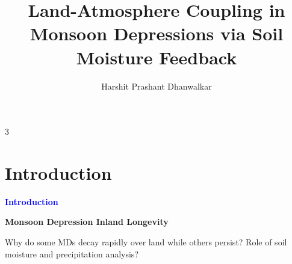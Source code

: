 \documentclass[8pt, aspectratio=169]{beamer}
\title{Land-Atmosphere Coupling in Monsoon Depressions via Soil Moisture Feedback}
\author{Harshit Prashant Dhanwalkar}
\date{}
\newcommand{\pdflink}[2]{\href{file:papers/#1.pdf}{#2}}
\begin{document}

\begin{frame}[plain, c]
    \vspace{-1cm}
    \tiny
    \setcounter{tocdepth}{3} %
    \begin{multicols}{3}
        \tableofcontents
    \end{multicols}
\end{frame}

\section{Introduction}
\begin{frame}
    \begin{center}
        \Huge \textcolor{blue}{\textbf{Introduction}} \\
    \end{center}
    \setcounter{framenumber}{0}
\end{frame}

\begin{frame}
    \begin{center}
        \Large
        \textbf{Monsoon Depression Inland Longevity}

        \vspace{1cm}
        \normalsize
        Why do some MDs decay rapidly over land while others persist? Role of soil moisture and precipitation analysis?

    \end{center}
\end{frame}
\end{document}
